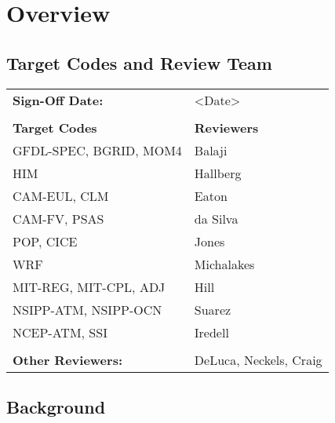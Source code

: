 \chapter{\longname Overview}

\section{Target Codes and Review Team}

\begin{tabular}{l l}

{\bf Sign-Off Date:}          & <Date> \\ \\

{\bf Target Codes}            & {\bf Reviewers} \\
GFDL-SPEC, BGRID, MOM4        & Balaji \\
HIM                           & Hallberg \\
CAM-EUL, CLM                  & Eaton \\
CAM-FV, PSAS                  & da Silva\\
POP, CICE                     & Jones \\
WRF                           & Michalakes \\
MIT-REG, MIT-CPL, ADJ         & Hill \\
NSIPP-ATM, NSIPP-OCN          & Suarez \\
NCEP-ATM, SSI                 & Iredell \\ \\

{\bf Other Reviewers:}        & DeLuca, Neckels, Craig

\end{tabular}


%

\section{\longname Background}



